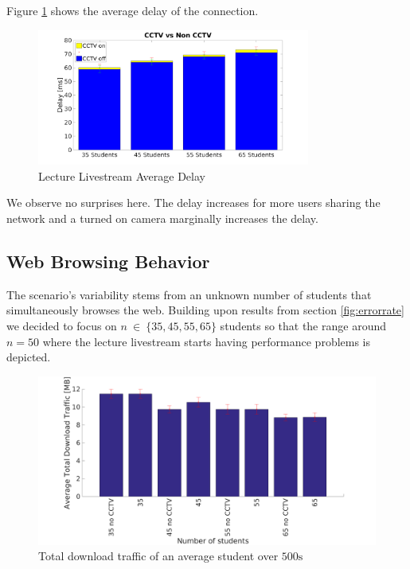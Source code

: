\documentclass[a4paper]{scrreprt}
\begin{document}
			Figure \ref{fig:delay} shows the average delay of the connection.
			\begin{figure}[H]
				\center\includegraphics[width=0.8\textwidth]{../Results_Analysis/Delay/delay_combined_plot.png}
				\caption{Lecture Livestream Average Delay}
				\label{fig:delay}
			\end{figure}					
			
			We observe no surprises here. The delay increases for more users sharing the network and a turned on camera marginally increases the delay.					
		
		\subsection{Web Browsing Behavior}\label{sec:http}
			The scenario's variability stems from an unknown number of students that simultaneously browses the web. Building upon results from section \ref{fig:errorrate} we decided to focus on $n~\in~\{35, 45, 55, 65\}$ students so that the range around $n=50$ where the lecture livestream starts having performance problems is depicted.
			
			\begin{figure}[H]
				\center\includegraphics[width=\textwidth]{../Results_Analysis/HTTP/http.png}
				\caption{Total download traffic of an average student over $500\text{s}$}
				\label{fig:http}
			\end{figure}
			
\end{document}
